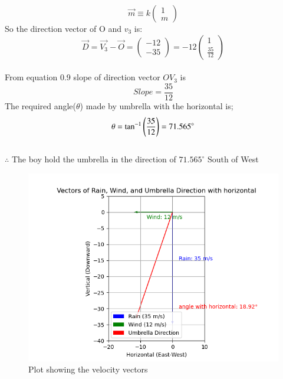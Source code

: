 \documentclass[journal]{IEEEtran}
\begin{document}
\begin{equation}
    \vec{m}\equiv k\begin{pmatrix}
        1\\
        m
    \end{pmatrix}
\end{equation}
So the direction vector of O and $v_{3}$ is:
\begin{equation}
    \vec{D}=\vec{V_{3}}-\vec{O}=\begin{pmatrix}
        -12\\
        -35
    \end{pmatrix}
=-12\begin{pmatrix}
    1\\
    \frac{35}{12}
\end{pmatrix}
\end{equation}\\
From equation 0.9 slope of direction vector $OV_{3}$ is\\
\begin{equation}
    Slope=\frac{35}{12}
\end{equation}
The required angle($\theta$) made by umbrella with the horizontal is;\\
\begin{equation}
    \theta=\tan^{-1}\left(\frac{35}{12}\right)=71.565^\circ
\end{equation}\\

 $\therefore$ The boy hold the umbrella in the direction of $71.565^\circ$ South of West\\

 \begin{figure}[h!]
   \centering
   \includegraphics[width=0.7\linewidth]{figs/figure1.png.jpg}
   \caption{Plot showing the velocity vectors}
   \label{stemplot}
\end{figure}
\end{document}
